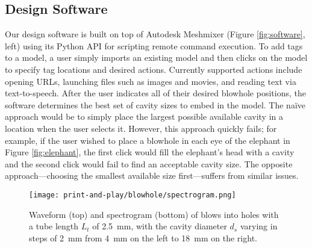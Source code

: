     \subsection{Design Software}
      Our design software is built on top of Autodesk Meshmixer (Figure
      \ref{fig:software}, left) using its Python API for scripting remote
      command execution. To add \bh tags to a model, a user simply imports an
      existing model and then clicks on the model to specify tag locations and
      desired actions. Currently supported actions include opening URLs,
      launching files such as images and movies, and reading text via
      text-to-speech. After the user indicates all of their desired blowhole
      positions, the software determines the best set of cavity sizes to embed
      in the model. The na\"ive approach would be to simply place the largest
      possible available cavity in a location when the user selects it. However,
      this approach quickly fails; for example, if the user wished to place a
      blowhole in each eye of the elephant in Figure \ref{fig:elephant}, the
      first click would fill the elephant's head with a cavity and the second
      click would fail to find an acceptable cavity size. The opposite
      approach---choosing the smallest available size first---suffers from
      similar issues. 
      
      \begin{figure*}[t]
        \centering
        \texttt{[image: print-and-play/blowhole/spectrogram.png]}
        \caption{Waveform (top) and spectrogram (bottom) of blows into holes with a tube length $L_t$ of 2.5~mm, with the cavity diameter $d_s$ varying in steps of 2~mm from 4~mm on the left to 18~mm on the right.}
        \label{fig:spectrogram}
      \end{figure*}

